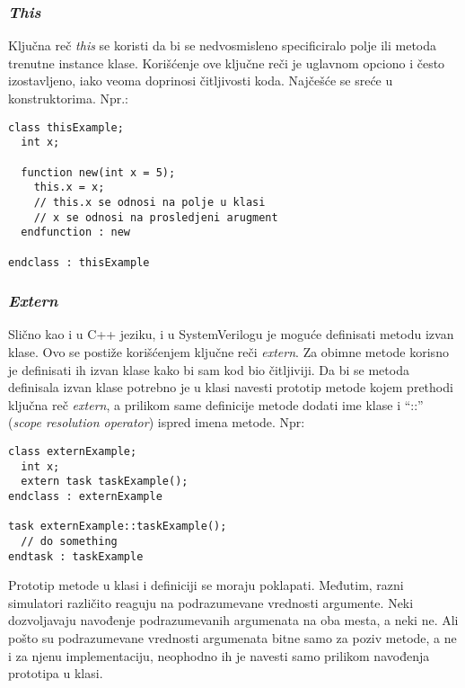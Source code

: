 
\subsubsection{\emph{This}}

Ključna reč \emph{this} se koristi da bi se nedvosmisleno specificiralo polje
ili metoda trenutne instance klase. Korišćenje ove ključne reči je uglavnom
opciono i često izostavljeno, iako veoma doprinosi čitljivosti koda. Najčešće se
sreće u konstruktorima. Npr.:

\begin{lstlisting}
class thisExample;
  int x;

  function new(int x = 5);
    this.x = x;
    // this.x se odnosi na polje u klasi
    // x se odnosi na prosledjeni arugment
  endfunction : new

endclass : thisExample
\end{lstlisting}


\subsubsection{\emph{Extern}}

Slično kao i u C++ jeziku, i u SystemVerilogu je moguće definisati metodu izvan
klase. Ovo se postiže korišćenjem ključne reči \emph{extern}. Za obimne metode
korisno je definisati ih izvan klase kako bi sam kod bio čitljiviji. Da bi se
metoda definisala izvan klase potrebno je u klasi navesti prototip metode kojem
prethodi ključna reč \emph{extern}, a prilikom same definicije metode dodati ime
klase i ``::'' (\emph{scope resolution operator}) ispred imena metode. Npr:

\begin{lstlisting}
class externExample;
  int x;
  extern task taskExample();
endclass : externExample

task externExample::taskExample();
  // do something
endtask : taskExample
\end{lstlisting}

Prototip metode u klasi i definiciji se moraju poklapati. Međutim, razni
simulatori različito reaguju na podrazumevane vrednosti argumente. Neki
dozvoljavaju navođenje podrazumevanih argumenata na oba mesta, a neki ne. Ali
pošto su podrazumevane vrednosti argumenata bitne samo za poziv metode, a ne i
za njenu implementaciju, neophodno ih je navesti samo prilikom navođenja
prototipa u klasi.

